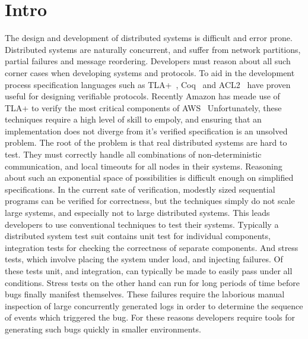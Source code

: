\section{Intro}
\label{sec:intro}

The design and development of distributed systems is difficult and error prone.
Distributed systems are naturally concurrent, and suffer from network
partitions, partial failures and message reordering. Developers must reason
about all such corner cases when developing systems and protocols. To aid in
the development process specification languages such as
TLA+~\cite{Lamport:1993:HST:646874.709976}, Coq~\cite{WilcoxWPTWEA2015} and
ACL2~\cite{588534} have proven useful for designing verifiable protocols.
Recently Amazon has meade use of TLA+ to verify the most critical components of
AWS~\cite{Newcombe:2015:AWS:2749359.2699417} Unfortunately, these techniques
require a high level of skill to empoly, and ensuring that an implementation
does not diverge from it's verified specification is an unsolved problem. The
root of the problem is that real distributed systems are hard to test. They
must correctly handle all combinations of non-deterministic communication, and
local timeouts for all nodes in their systems. Reasoning about such an
exponential space of possibilities is difficult enough on simplified
specifications. In the current sate of verification, modestly sized sequential
programs can be verified for correctness, but the techniques simply do not
scale large systems, and especially not to large distributed systems. This
leads developers to use conventional techniques to test their systems.
Typically a distributed system test suit contains unit test for individual
components, integration tests for checking the correctness of separate
components. And stress tests, which involve placing the system under load, and
injecting failures. Of these tests unit, and integration, can typically be made
to easily pass under all conditions. Stress tests on the other hand can run for
long periods of time before bugs finally manifest themselves.  These failures
require the laborious manual inspection of large concurrently generated logs in
order to determine the sequence of events which triggered the bug. For these
reasons developers require tools for generating such bugs quickly in smaller
environments. 

